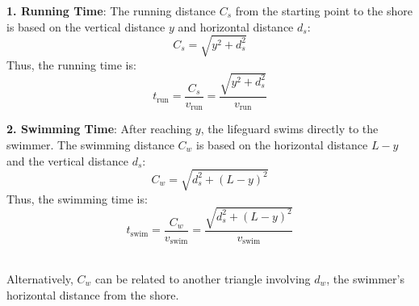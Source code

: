 \documentclass[a4paper, 12pt]{report}
\begin{document}
    \begin{minipage}{0.47\textwidth}
        \textbf{1. Running Time}: The running distance \( C_s \) from the starting point to the shore is based on the vertical distance \( y \) and horizontal distance \( d_s \):
        \[
        C_s = \sqrt{y^2 + d_s^2}
        \]
        Thus, the running time is:
        \[
        t_{\text{run}} = \frac{C_s}{v_{\text{run}}} = \frac{\sqrt{y^2 + d_s^2}}{v_{\text{run}}}
        \]
    \end{minipage}
    \hfill
    \begin{minipage}{0.485\textwidth}    
        \textbf{2. Swimming Time}: After reaching \( y \), the lifeguard swims directly to the swimmer. The swimming distance \( C_w \) is based on the horizontal distance \( L - y \) and the vertical distance \( d_s \):
        \[
        C_w = \sqrt{d_s^2 + (L - y)^2}
        \]
        Thus, the swimming time is:
        \[
        t_{\text{swim}} = \frac{C_w}{v_{\text{swim}}} = \frac{\sqrt{d_s^2 + (L - y)^2}}{v_{\text{swim}}}
        \]
    \end{minipage}\\[1em]
   
    Alternatively, \( C_w \) can be related to another triangle involving \( d_w \), the swimmer’s horizontal distance from the shore.
\end{document}
